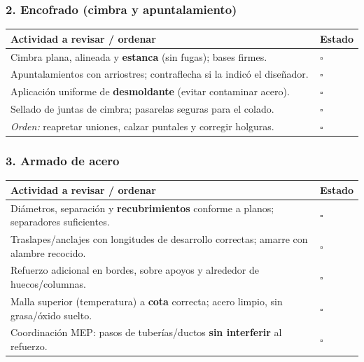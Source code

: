 \documentclass[12pt]{article}
\newcommand{\cbox}{\(\square\)} %
\begin{document}
 \subsubsection*{2. Encofrado (cimbra y apuntalamiento)}
 \begin{tabularx}{\linewidth}{>{\raggedright\arraybackslash}p{0.93\linewidth} >{\centering\arraybackslash}m{0.07\linewidth}}
 	\toprule
 	\textbf{Actividad a revisar / ordenar} & \textbf{Estado}\\
 	\midrule
 	Cimbra plana, alineada y \textbf{estanca} (sin fugas); bases firmes. & \cbox \\
 	Apuntalamientos con arriostres; contraflecha si la indicó el diseñador. & \cbox \\
 	Aplicación uniforme de \textbf{desmoldante} (evitar contaminar acero). & \cbox \\
 	Sellado de juntas de cimbra; pasarelas seguras para el colado. & \cbox \\
 	\textit{Orden:} reapretar uniones, calzar puntales y corregir holguras. & \cbox \\
 	\bottomrule
 \end{tabularx}
 
 \subsubsection*{3. Armado de acero}
 \begin{tabularx}{\linewidth}{>{\raggedright\arraybackslash}p{0.93\linewidth} >{\centering\arraybackslash}m{0.07\linewidth}}
 	\toprule
 	\textbf{Actividad a revisar / ordenar} & \textbf{Estado}\\
 	\midrule
 	Diámetros, separación y \textbf{recubrimientos} conforme a planos; separadores suficientes. & \cbox \\
 	Traslapes/anclajes con longitudes de desarrollo correctas; amarre con alambre recocido. & \cbox \\
 	Refuerzo adicional en bordes, sobre apoyos y alrededor de huecos/columnas. & \cbox \\
 	Malla superior (temperatura) a \textbf{cota} correcta; acero limpio, sin grasa/óxido suelto. & \cbox \\
 	Coordinación MEP: pasos de tuberías/ductos \textbf{sin interferir} al refuerzo. & \cbox \\
 	\bottomrule
 \end{tabularx}
 
\end{document}
